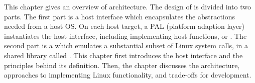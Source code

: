 This chapter gives an overview of \graphene{} architecture.
The design of \graphene{} is divided into two parts.
The first part is a host interface which encapsulates the abstractions needed from a host OS.
On each host target, a PAL (platform adaption layer) instantiates the host interface,
including implementing \palcallnum{} host functions, or \hostapis{}.
The second part is a \libos{} which emulates a substantial subset of Linux system calls,
in a shared library called \thelibos{}.
This chapter first introduces the host interface and the principles behind its definition.
Then, the chapter discusses the \libos{} architecture,
approaches to implementing Linux functionality,
and trade-offs
for \libos{} development.


